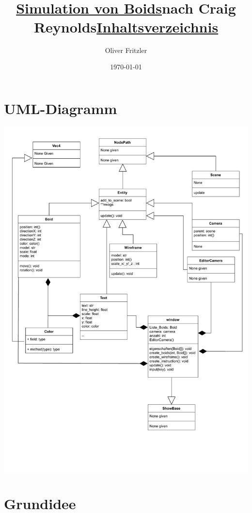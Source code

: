 \documentclass[a4paper, 12pt]{article}
\begin{document}
	\begin{titlepage}
		\title{\Large{\textbf{\underline{Simulation von Boids}}}\linebreak\large\textbf{nach Craig Reynolds}}
		\author{Oliver Fritzler}
		\date{\today}
		\maketitle
	\end{titlepage}
	\title{\Large{\textbf{\underline{Inhaltsverzeichnis}}}}
	\tableofcontents
	\section{UML-Diagramm}
	\includegraphics[scale=0.75, page=1]{UML/Boids_UML.pdf}
	\newpage
	\section{Grundidee}
\end{document}
